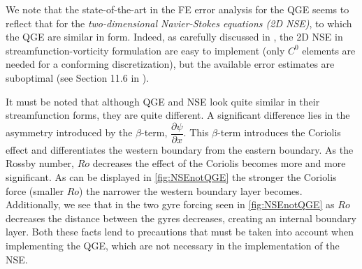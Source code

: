 We note that the state-of-the-art in the FE error analysis for the QGE seems to
reflect that for the \emph{two-dimensional Navier-Stokes equations (2D NSE)}, to
which the QGE are similar in form.  Indeed, as carefully discussed in
\cite{Gunzburger89}, the 2D NSE in streamfunction-vorticity formulation are easy
to implement (only $C^0$ elements are needed for a conforming discretization),
but the available error estimates are suboptimal (see Section 11.6 in
\cite{Gunzburger89}).
\begin{remark}
  It must be noted that although QGE and NSE look quite similar in their
  streamfunction forms, they are quite different. A significant difference lies
  in the asymmetry introduced by the $\beta$-term, $\dfrac{\partial
  \psi}{\partial x}$. This $\beta$-term introduces the Coriolis effect and
  differentiates the western boundary from the eastern boundary.  As the Rossby
  number, $Ro$ decreases the effect of the Coriolis becomes more and more
  significant. As can be displayed in \autoref{fig:NSEnotQGE} the stronger the
  Coriolis force (smaller $Ro$) the narrower the western boundary layer becomes.
  Additionally, we see that in the two gyre forcing seen in
  \autoref{fig:NSEnotQGE} as $Ro$ decreases the distance between the gyres
  decreases, creating an internal boundary layer. Both these facts lend to
  precautions that must be taken into account when implementing the QGE, which
  are not necessary in the implementation of the NSE.
\end{remark}


